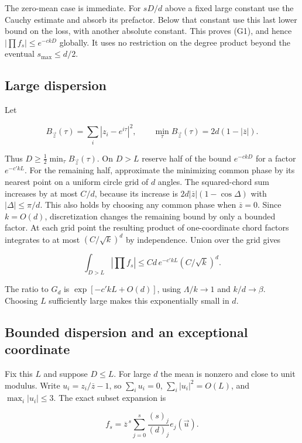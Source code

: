 The zero-mean case is immediate. For $sD/d$ above a fixed large constant use the Cauchy estimate and absorb its prefactor. Below that constant use this last lower bound on the loss, with another absolute constant. This proves (G1), and hence $|\prod f_s|\le e^{-c kD}$ globally. It uses no restriction on the degree product beyond the eventual $s_{\max}\le d/2$.

\subsection{Large dispersion}

Let

\begin{equation*}
B_{\vec z}(\tau)=\sum_i|z_i-e^{i\tau}|^2,\qquad
\min_\tau B_{\vec z}(\tau)=2d(1-|\overline z|).
\end{equation*}

Thus $D\ge\tfrac12\min_\tau B_{\vec z}(\tau)$. On $D>L$ reserve half of the bound $e^{-c kD}$ for a factor $e^{-c' kL}$. For the remaining half, approximate the minimizing common phase by its nearest point on a uniform circle grid of $d$ angles. The squared-chord sum increases by at most $C/d$, because its increase is $2d|\overline z|(1-\cos\Delta)$ with $|\Delta|\le\pi/d$. This also holds by choosing any common phase when $\overline z=0$. Since $k=O(d)$, discretization changes the remaining bound by only a bounded factor. At each grid point the resulting product of one-coordinate chord factors integrates to at most $(C/\sqrt k)^d$ by independence. Union over the grid gives

\begin{equation*}
\int_{D>L}\left|\prod f_s\right|\le C d\, e^{-c'kL}(C/\sqrt k)^d.
\end{equation*}

The ratio to $G_d$ is $\exp[-c'kL+O(d)]$, using $\Lambda/k\to1$ and $k/d\to\beta$. Choosing $L$ sufficiently large makes this exponentially small in $d$.

\subsection{Bounded dispersion and an exceptional coordinate}

Fix this $L$ and suppose $D\le L$. For large $d$ the mean is nonzero and close to unit modulus. Write $u_i=z_i/\overline z-1$, so $\sum_i u_i=0$, $\sum_i|u_i|^2=O(L)$, and $\max_i|u_i|\le3$. The exact subset expansion is

\begin{equation*}
f_s=\overline z^{\,s}\sum_{j=0}^s\frac{(s)_j}{(d)_j}e_j(\vec u).
\end{equation*}


